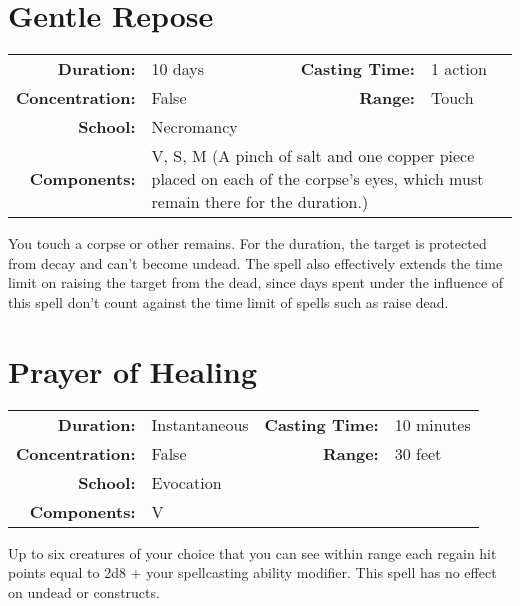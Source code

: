 \documentclass[a5paper, 12pt]{memoir}
\begin{document}
\newpage
\section*{Gentle Repose}

{
\small\centering\vspace{-6pt}
\begin{tabular}{rlrl}
\toprule

\textbf{Duration:} & 10 days &
\textbf{Casting Time:} & 1 action \\
\textbf{Concentration:} & False &
\textbf{Range:} & Touch \\
\textbf{School:} & Necromancy \\
\textbf{Components:} & \multicolumn{3}{p{0.7\textwidth}}{V, S, M (A pinch of salt and one copper piece placed on each of the corpse's eyes, which must remain there for the duration.)}\\

\bottomrule
\end{tabular}
}

\vspace{1\baselineskip}\noindent You touch a corpse or other remains. For the duration, the target is protected from decay and can't become undead. The spell also effectively extends the time limit on raising the target from the dead, since days spent under the influence of this spell don't count against the time limit of spells such as raise dead.

\newpage
\section*{Prayer of Healing}

{
\small\centering\vspace{-6pt}
\begin{tabular}{rlrl}
\toprule

\textbf{Duration:} & Instantaneous &
\textbf{Casting Time:} & 10 minutes \\
\textbf{Concentration:} & False &
\textbf{Range:} & 30 feet \\
\textbf{School:} & Evocation \\
\textbf{Components:} & \multicolumn{3}{p{0.7\textwidth}}{V}\\

\bottomrule
\end{tabular}
}

\vspace{1\baselineskip}\noindent Up to six creatures of your choice that you can see within range each regain hit points equal to 2d8 + your spellcasting ability modifier. This spell has no effect on undead or constructs.
\end{document}
